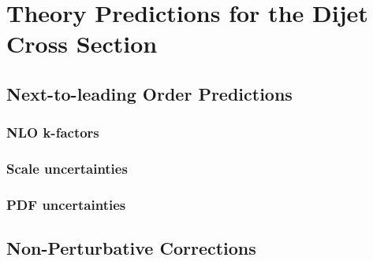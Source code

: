 \chapter{Theory Predictions for the Dijet Cross Section}

\section{Next-to-leading Order Predictions}

\subsection{NLO k-factors}

\subsection{Scale uncertainties}

\subsection{PDF uncertainties}

\section{Non-Perturbative Corrections}
